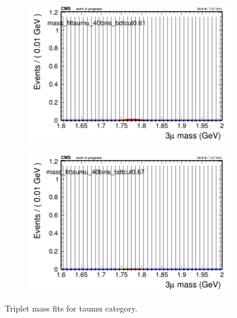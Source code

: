 \begin{figure}[H]
\begin{subfigure}{0.2\textwidth}
        \includegraphics[width=\textwidth]{power_law/plots/taumu/massfit_taumu_40bins_bdtcut0.61.png}
        \caption{}
    \end{subfigure}
    \begin{subfigure}{0.2\textwidth}
        \includegraphics[width=\textwidth]{power_law/plots/taumu/massfit_taumu_40bins_bdtcut0.67.png}
        \caption{}
    \end{subfigure}
    \caption{Triplet mass fits for taumu category.}
    \label{fig:powerlawtaumu}
\end{figure}

